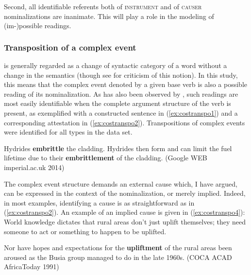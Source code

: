 \noindent Second, all identifiable referents both of \textsc{instrument} and of \textsc{causer} nominalizations are inanimate. This will play a role in the modeling of (im-)possible readings.  

\subsubsection{{Transposition of a complex event}}
\label{sec:cos-output-survey-trans}


 is generally regarded as a change of syntactic category of a word without a change in the semantics (though see \citealt{Lieber.2015} for criticism of this notion). In this study, this means that the complex event denoted by a given base verb is also a possible reading of its nominalization. 
As has also been observed by \citet[207]{Bauer.2013}, such readings are most easily identifiable when the complete argument structure of the verb is present, as exemplified with a constructed sentence in (\ref{ex:costranspo1}) and a corresponding attestation in (\ref{ex:costranspo2}). Transpositions of complex events were identified for all types in the data set.

\begin{exe}
  \ex \label{ex:costranspo} 
  \begin{xlist}
    \ex \label{ex:costranspo1} Hydrides \textbf{embrittle} the cladding.
    \ex \label{ex:costranspo2} Hydrides then form and can limit the fuel lifetime due to their \textbf{embrittlement} of the cladding. {\small(Google WEB imperial.ac.uk 2014)}
  \end{xlist}
\end{exe}

\noindent The complex event structure demands an external cause which, I have argued, can be expressed in the context of the nominalization, or merely implied. Indeed, in most examples, identifying a cause is as straightforward as in (\ref{ex:costranspo2}). An example of an implied cause is given in (\ref{ex:costranspo4}): World knowledge dictates that rural areas don't just uplift themselves; they need someone to act or something to happen to be uplifted. 

\begin{exe}
  \ex \label{ex:costranspo4} Nor have hopes and expectations for the \textbf{upliftment} of the rural areas been aroused as the Busia group managed to do in the late 1960s. {\small(\acs{COCA} ACAD AfricaToday 1991)}
\end{exe}

